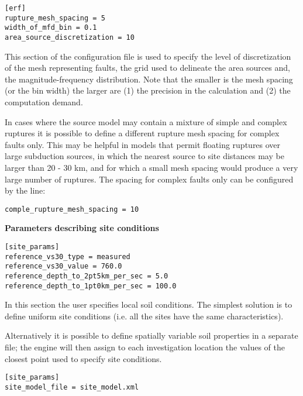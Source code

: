 \begin{verbatim}
[erf]
rupture_mesh_spacing = 5
width_of_mfd_bin = 0.1
area_source_discretization = 10
\end{verbatim}

This section of the configuration file is used to specify the level of
discretization of the mesh representing faults, the grid used to delineate the area sources and, the magnitude-frequency distribution. Note that the smaller is the mesh spacing (or the bin width) the larger are (1) the precision in the calculation and (2) the computation demand.

In cases where the source model may contain a mixture of simple and complex ruptures it is possible to define a different rupture mesh spacing for complex faults only. This may be helpful in models that permit floating ruptures over large subduction sources, in which the nearest source to site distances may be larger than 20 - 30 km, and for which a small mesh spacing would produce a very large number of ruptures. The spacing for complex faults only can be configured by the line:

\begin{verbatim}
comple_rupture_mesh_spacing = 10
\end{verbatim}

\textbf{Parameters describing site conditions}

\begin{verbatim}
[site_params]
reference_vs30_type = measured
reference_vs30_value = 760.0
reference_depth_to_2pt5km_per_sec = 5.0
reference_depth_to_1pt0km_per_sec = 100.0
\end{verbatim}

In this section the user specifies local soil conditions. The simplest
solution is to define uniform site conditions (i.e. all the sites have  the
same characteristics).

Alternatively it is possible to define  spatially variable soil properties in
a separate file; the engine will then assign to each investigation location
the values of the closest point used to specify site conditions.

\begin{verbatim}
[site_params]
site_model_file = site_model.xml
\end{verbatim}

